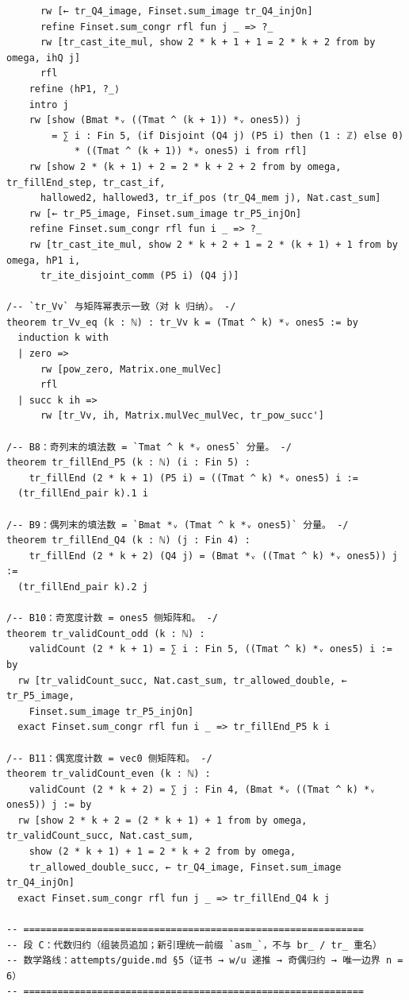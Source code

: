 \documentclass[11pt]{article}
\begin{document}
\begin{lstlisting}
      rw [← tr_Q4_image, Finset.sum_image tr_Q4_injOn]
      refine Finset.sum_congr rfl fun j _ => ?_
      rw [tr_cast_ite_mul, show 2 * k + 1 + 1 = 2 * k + 2 from by omega, ihQ j]
      rfl
    refine ⟨hP1, ?_⟩
    intro j
    rw [show (Bmat *ᵥ ((Tmat ^ (k + 1)) *ᵥ ones5)) j
        = ∑ i : Fin 5, (if Disjoint (Q4 j) (P5 i) then (1 : ℤ) else 0)
            * ((Tmat ^ (k + 1)) *ᵥ ones5) i from rfl]
    rw [show 2 * (k + 1) + 2 = 2 * k + 2 + 2 from by omega, tr_fillEnd_step, tr_cast_if,
      hallowed2, hallowed3, tr_if_pos (tr_Q4_mem j), Nat.cast_sum]
    rw [← tr_P5_image, Finset.sum_image tr_P5_injOn]
    refine Finset.sum_congr rfl fun i _ => ?_
    rw [tr_cast_ite_mul, show 2 * k + 2 + 1 = 2 * (k + 1) + 1 from by omega, hP1 i,
      tr_ite_disjoint_comm (P5 i) (Q4 j)]

/-- `tr_Vv` 与矩阵幂表示一致（对 k 归纳）。 -/
theorem tr_Vv_eq (k : ℕ) : tr_Vv k = (Tmat ^ k) *ᵥ ones5 := by
  induction k with
  | zero =>
      rw [pow_zero, Matrix.one_mulVec]
      rfl
  | succ k ih =>
      rw [tr_Vv, ih, Matrix.mulVec_mulVec, tr_pow_succ']

/-- B8：奇列末的填法数 = `Tmat ^ k *ᵥ ones5` 分量。 -/
theorem tr_fillEnd_P5 (k : ℕ) (i : Fin 5) :
    tr_fillEnd (2 * k + 1) (P5 i) = ((Tmat ^ k) *ᵥ ones5) i :=
  (tr_fillEnd_pair k).1 i

/-- B9：偶列末的填法数 = `Bmat *ᵥ (Tmat ^ k *ᵥ ones5)` 分量。 -/
theorem tr_fillEnd_Q4 (k : ℕ) (j : Fin 4) :
    tr_fillEnd (2 * k + 2) (Q4 j) = (Bmat *ᵥ ((Tmat ^ k) *ᵥ ones5)) j :=
  (tr_fillEnd_pair k).2 j

/-- B10：奇宽度计数 = ones5 侧矩阵和。 -/
theorem tr_validCount_odd (k : ℕ) :
    validCount (2 * k + 1) = ∑ i : Fin 5, ((Tmat ^ k) *ᵥ ones5) i := by
  rw [tr_validCount_succ, Nat.cast_sum, tr_allowed_double, ← tr_P5_image,
    Finset.sum_image tr_P5_injOn]
  exact Finset.sum_congr rfl fun i _ => tr_fillEnd_P5 k i

/-- B11：偶宽度计数 = vec0 侧矩阵和。 -/
theorem tr_validCount_even (k : ℕ) :
    validCount (2 * k + 2) = ∑ j : Fin 4, (Bmat *ᵥ ((Tmat ^ k) *ᵥ ones5)) j := by
  rw [show 2 * k + 2 = (2 * k + 1) + 1 from by omega, tr_validCount_succ, Nat.cast_sum,
    show (2 * k + 1) + 1 = 2 * k + 2 from by omega,
    tr_allowed_double_succ, ← tr_Q4_image, Finset.sum_image tr_Q4_injOn]
  exact Finset.sum_congr rfl fun j _ => tr_fillEnd_Q4 k j

-- ============================================================
-- 段 C：代数归约（组装员追加；新引理统一前缀 `asm_`，不与 br_ / tr_ 重名）
-- 数学路线：attempts/guide.md §5（证书 → w/u 递推 → 奇偶归约 → 唯一边界 n = 6）
-- ============================================================


\end{lstlisting}
\end{document}
